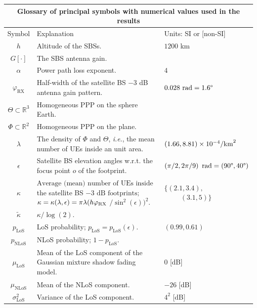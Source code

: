 \documentclass[lettersize,journal]{IEEEtran}
\newcommand{\R}{\mathbb{R}}
\begin{document}
\begin{table}
  \begin{center}
    \begin{tabular}{|c|p{4.5cm}|p{1.9cm}|}
      \hline
      \multicolumn{3}{|c|}{Glossary of principal symbols with numerical values used in the results} \\
      \hline
      Symbol& Explanation &Units: SI or [non-SI]
      \\ 
      \hline
      $h$ & Altitude of the SBSs. &$1200$ km  \\
      $G[\cdot]$ & The SBS antenna gain.& \\
      $\alpha$ &Power path loss exponent.& $4$\\
      $\varphi_{\text{RX}}$ & Half-width of the satellite BS $-3$ dB antenna gain pattern.&$0.028 \text{ rad}\break =1.6\degree$   \\
      $\Theta \subset \R^3 $ & Homogeneous PPP on the sphere Earth.& \\
      $\Phi \subset \R^2$ & Homogeneous PPP on the plane. &\\
      $\lambda$ & The density of $\Phi$ and $\Theta$, \textit{i.e.}, the mean number of UEs inside an unit area.&$(1.66,8.81)\break\times10^{-4}\text{/km}^2$\\
      $\epsilon$&  Satellite BS elevation angles w.r.t. the focus point $\textit{o}$ of the footprint.&$\left({\pi}/{2},{2\pi}/{9}\right)\text{ rad}\break=(90\degree,40\degree)$\\
      $\kappa$  & $\text{Average (mean) number of }  \text{UEs inside}$ the satellite BS $-3 \text{ dB footprints};$ \hfill \break $\kappa =\kappa(\lambda,\epsilon) = \pi \lambda (h\varphi_{\textup{RX}}$ $/\sin^2(\epsilon))^2.$& $\{(2.1,3.4),$\hfill \break  $\hspace{1cm} (3.1,5)\}$  \\
      ${\tilde{\kappa}}$ &  $\kappa/\log(2)$.& \\
      $p_{\text{LoS}}$& LoS probability; $p_{\text{LoS}} = p_{\text{LoS}}(\epsilon)$. & $(0.99,0.61)$\\
      $p_{\text{NLoS}}$& NLoS probability; $1-p_{\text{LoS}}$. & \\
      $\mu_{\text{LoS}}$& Mean of the LoS component of the Gaussian mixture shadow fading model. & $0$ [dB] \\
      $\mu_{\text{NLoS}}$& Mean of the NLoS component. & $-26$ [dB] \\
      $\sigma^2_{\text{LoS}}$& Variance of the LoS component. & $4^2$ [dB] \\

\end{tabular}
\end{center}
\end{table}
\end{document}
